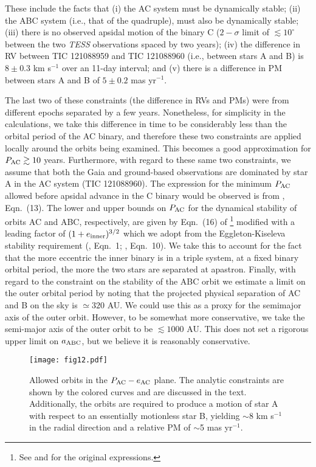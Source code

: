 \documentclass[fleqn,usenatbib]{mnras} %
\begin{document}
These include the facts that (i) the AC system must be dynamically stable; (ii) the ABC system (i.e., that of the quadruple), must also be dynamically stable; (iii) there is no observed apsidal motion of the binary C ($2-\sigma$ limit of $\lesssim 10^\circ$ between the two {\em TESS} observations spaced by two years); (iv) the difference in RV between TIC 121088959 and TIC 121088960 (i.e., between stars A and B) is $8 \pm 0.3$ km s$^{-1}$ over an 11-day interval; and (v) there is a difference in PM between stars A and B of $5 \pm 0.2$ mas yr$^{-1}$.

The last two of these constraints (the difference in RVs and PMs) were from different epochs separated by a few years. Nonetheless, for simplicity in the calculations, we take this difference in time to be considerably less than the orbital period of the AC binary, and therefore these two constraints are applied locally around the orbits being examined.  This becomes a good approximation for $P_{\rm AC} \gtrsim 10$ years. Furthermore, with regard to these same two constraints, we assume that both the Gaia and ground-based observations are dominated by star A in the AC system (TIC 121088960). The expression for the minimum $P_{\rm AC}$ allowed before apsidal advance in the C binary would be observed is from \citet{Rappaport2017}, Eqn.~(13).  The lower and upper bounds on $P_{\rm AC}$ for the dynamical stability of orbits AC and ABC, respectively, are given by Eqn.~(16) of \citet{Rappaport2013}\footnote{See \citet{Mardling2001} and \citet{Mikkola2008} for the original expressions.} modified with a leading factor of $(1+e_{\rm inner})^{3/2}$ which we adopt from the Eggleton-Kiseleva stability requirement (\citealt{Eggleton1995}, Eqn.~1; \citealt{Mikkola2008}, Eqn.~10).  We take this to account for the fact that the more eccentric the inner binary is in a triple system, at a fixed binary orbital period, the more the two stars are separated at apastron.  Finally, with regard to the constraint on the stability of the ABC orbit we estimate a limit on the outer orbital period by noting that the projected physical separation of  AC and B on the sky is $\simeq 320$ AU.  We could use this as a proxy for the semimajor axis of the outer orbit.  However, to be somewhat more conservative, we take the semi-major axis of the outer orbit to be $\lesssim 1000$ AU. This does not set a rigorous upper limit on $a_{\rm ABC}$, but we believe it is reasonably conservative.

\begin{figure}
\centering
\texttt{[image: fig12.pdf]}
\caption{Allowed orbits in the $P_{\rm AC}-e_{\rm AC}$ plane.  The analytic constraints are shown by the colored curves and are discussed in the text.  Additionally, the orbits are required to produce a motion of star A with respect to an essentially motionless star B, yielding $\sim$8 km s$^{-1}$ in the radial direction and a relative PM of $\sim$5 mas yr$^{-1}$.}
\label{fig:ecc_vs_P}
\end{figure}
\end{document}
